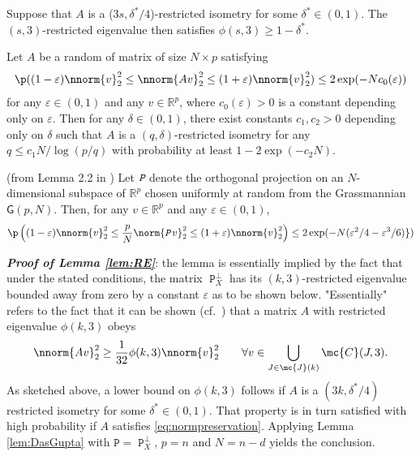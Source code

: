 \documentclass[11pt]{article}
\def\R{\mathbb{R}}
\DeclareMathOperator{\pr}{\texttt{P}}
\DeclareMathOperator{\pre}{\emph{\texttt{P}}}
\def\epss{\varepsilon}
\begin{document}
\begin{lemma}\cite{Bickel2009} Suppose that $A$ is a ($3s, \delta^*/4$)-restricted isometry for some $\delta^* \in (0,1)$. The $(s, 3)$-restricted eigenvalue then satisfies $\phi(s, 3) \geq 1 - \delta^*$. 
\end{lemma}

\begin{lemma}\cite{Baraniuk2006}
Let $A$ be a random of matrix of size $N \times p$ satisfying %
\begin{equation}\label{eq:normpreservation}
 \p((1 - \epss) \nnorm{v}_2^2 \leq \nnorm{A v}_2^2 \leq (1 + \epss) \nnorm{v}_2^2) \leq 2 \exp(-N c_0(\epss))
\end{equation}
for any $\epss \in (0,1)$ and any $v \in \R^p$, where $c_0(\epss) > 0$ is a constant depending only on $\epss$. Then for any $\delta \in (0,1)$, there exist constants $c_1, c_2 > 0$ depending only on $\delta$ such that $A$ is a $(q, \delta)$-restricted isometry for any $q \leq c_1 N / \log(p/q)$ with probability at least $1 - 2 \exp(-c_2 N)$. 
\end{lemma}

\begin{lemma}\label{lem:DasGupta}(from Lemma 2.2 in \cite{DasGupta2003})
  Let $\pre$ denote the orthogonal projection on an $N$-dimensional subspace of $\R^p$ chosen uniformly at
  random from the Grassmannian $\textsf{G}(p, N)$. Then, for any $v \in \R^p$ and any $\epss \in (0,1)$,
  \begin{equation*}
    \p \left((1 - \epss) \nnorm{v}_2^2 \leq \frac{p}{N} \norm{\pre v}_2^2 \leq (1 + \epss) \nnorm{v}_2^2 \right) \leq 2 \exp(-N  (\epss^2/4 - \epss^3/6) \})
  \end{equation*}
\end{lemma}

\noindent\emph{\textbf{Proof of Lemma \ref{lem:RE}}}: the lemma is essentially implied by the fact that under the stated conditions, the matrix $\pr_{X}^{\perp}$ has its $(k,3)$-restricted eigenvalue bounded away from zero by a constant $\epss$ as to be shown below. "Essentially" refers to the fact that it can be shown (cf.~\cite{Zhou2009}) that a matrix $A$ with restricted eigenvalue $\phi(k,3)$ obeys
\begin{equation*}
\nnorm{A v}_2^2 \geq \frac{1}{32} \phi(k,3) \nnorm{v}_2^2 \qquad \forall v \in \bigcup_{J \in \mc{J}(k)} \mc{C}(J,3). 
\end{equation*}  
As sketched above, a lower bound on $\phi(k,3)$ follows if $A$ is a $(3k, \delta^*/4)$ restricted isometry for some $\delta^* \in (0,1)$. That property is in turn satisfied with high probability if $A$ satisfies \eqref{eq:normpreservation}. Applying Lemma \ref{lem:DasGupta} with 
$\texttt{P} = \pr_{X}^{\perp}$, $p = n$ and $N = n-d$ yields the conclusion.    
\end{document}
